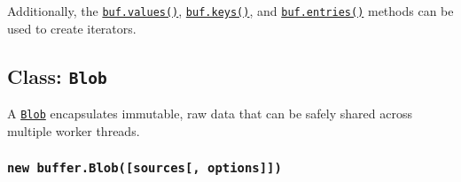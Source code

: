 \begin{Shaded}
\begin{Highlighting}[]
\NormalTok{ \{ }\NormalTok{ \} }\OperatorTok{=} \NormalTok{(}\NormalTok{)}\OperatorTok{;}

\OperatorTok{=} \NormalTok{([}\OperatorTok{,} \OperatorTok{,} \NormalTok{])}\OperatorTok{;}

\NormalTok{ (}
  \OperatorTok{;}
\NormalTok{\}}
\end{Highlighting}
\end{Shaded}

Additionally, the \hyperref[bufvalues]{\texttt{buf.values()}},
\hyperref[bufkeys]{\texttt{buf.keys()}}, and
\hyperref[bufentries]{\texttt{buf.entries()}} methods can be used to
create iterators.

\subsection{\texorpdfstring{Class:
\texttt{Blob}}{Class: Blob}}\label{class-blob}

A
\href{https://developer.mozilla.org/en-US/docs/Web/API/Blob}{\texttt{Blob}}
encapsulates immutable, raw data that can be safely shared across
multiple worker threads.

\subsubsection{\texorpdfstring{\texttt{new\ buffer.Blob({[}sources{[},\ options{]}{]})}}{new buffer.Blob({[}sources{[}, options{]}{]})}}\label{new-buffer.blobsources-options}

